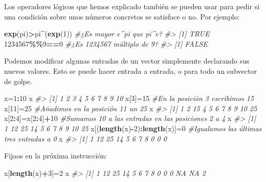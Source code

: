 \documentclass[
]{book}
\newenvironment{Shaded}{\begin{snugshade}}{\end{snugshade}}
\newcommand{\CommentTok}[1]{\textcolor[rgb]{0.56,0.35,0.01}{\textit{#1}}}
\newcommand{\DecValTok}[1]{\textcolor[rgb]{0.00,0.00,0.81}{#1}}
\newcommand{\KeywordTok}[1]{\textcolor[rgb]{0.13,0.29,0.53}{\textbf{#1}}}
\newcommand{\NormalTok}[1]{#1}
\newcommand{\OperatorTok}[1]{\textcolor[rgb]{0.81,0.36,0.00}{\textbf{#1}}}
\theoremstyle{definition}
\theoremstyle{definition}
\theoremstyle{definition}
\theoremstyle{remark}
\begin{document}
Los operadores lógicos que hemos explicado también se pueden usar para pedir si una condición sobre unos números concretos se satisface o no. Por ejemplo:

\begin{Shaded}
\begin{Highlighting}[]
\KeywordTok{exp}\NormalTok{(pi)}\OperatorTok{\textgreater{}}\NormalTok{pi}\OperatorTok{\^{}}\NormalTok{(}\KeywordTok{exp}\NormalTok{(}\DecValTok{1}\NormalTok{)) }\CommentTok{\#¿Es mayor e\^{}pi que pi\^{}e?}
\CommentTok{\#\textgreater{} [1] TRUE}
\DecValTok{1234567}\OperatorTok{\%\%}\DecValTok{9}\OperatorTok{==}\DecValTok{0} \CommentTok{\#¿Es 1234567 múltiplo de 9?}
\CommentTok{\#\textgreater{} [1] FALSE}
\end{Highlighting}
\end{Shaded}

Podemos modificar algunas entradas de un vector simplemente declarando sus nuevos valores. Esto se puede hacer entrada a entrada, o para todo un subvector de golpe.

\begin{Shaded}
\begin{Highlighting}[]
\NormalTok{x=}\DecValTok{1}\OperatorTok{:}\DecValTok{10}
\NormalTok{x}
\CommentTok{\#\textgreater{}  [1]  1  2  3  4  5  6  7  8  9 10}
\NormalTok{x[}\DecValTok{3}\NormalTok{]=}\DecValTok{15} \CommentTok{\#En la posición 3 escribimos 15}
\NormalTok{x[}\DecValTok{11}\NormalTok{]=}\DecValTok{25} \CommentTok{\#Añadimos en la posición 11 un 25}
\NormalTok{x}
\CommentTok{\#\textgreater{}  [1]  1  2 15  4  5  6  7  8  9 10 25}
\NormalTok{x[}\DecValTok{2}\OperatorTok{:}\DecValTok{4}\NormalTok{]=x[}\DecValTok{2}\OperatorTok{:}\DecValTok{4}\NormalTok{]}\OperatorTok{+}\DecValTok{10} \CommentTok{\#Sumamos 10 a las entradas en las posiciones 2 a 4}
\NormalTok{x}
\CommentTok{\#\textgreater{}  [1]  1 12 25 14  5  6  7  8  9 10 25}
\NormalTok{x[(}\KeywordTok{length}\NormalTok{(x)}\OperatorTok{{-}}\DecValTok{2}\NormalTok{)}\OperatorTok{:}\KeywordTok{length}\NormalTok{(x)]=}\DecValTok{0}   \CommentTok{\#Igualamos las últimas tres entradas a 0}
\NormalTok{x}
\CommentTok{\#\textgreater{}  [1]  1 12 25 14  5  6  7  8  0  0  0}
\end{Highlighting}
\end{Shaded}

Fijaos en la próxima instrucción:

\begin{Shaded}
\begin{Highlighting}[]
\NormalTok{x[}\KeywordTok{length}\NormalTok{(x)}\OperatorTok{+}\DecValTok{3}\NormalTok{]=}\DecValTok{2}   
\NormalTok{x}
\CommentTok{\#\textgreater{}  [1]  1 12 25 14  5  6  7  8  0  0  0 NA NA  2}
\end{Highlighting}
\end{Shaded}
\end{document}
